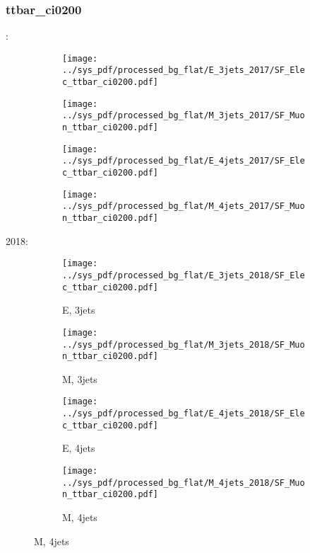 \documentclass{beamer}
\begin{document}
\begin{frame}
\frametitle{ttbar_ci0200}
\fontsize{5}{1}:
\begin{figure}
\centering
\begin{subfigure}[b]{0.24\textwidth}
\texttt{[image: ../sys\_pdf/processed\_bg\_flat/E\_3jets\_2017/SF\_Elec\_ttbar\_ci0200.pdf]}
\end{subfigure}
\begin{subfigure}[b]{0.24\textwidth}
\texttt{[image: ../sys\_pdf/processed\_bg\_flat/M\_3jets\_2017/SF\_Muon\_ttbar\_ci0200.pdf]}
\end{subfigure}
\begin{subfigure}[b]{0.24\textwidth}
\texttt{[image: ../sys\_pdf/processed\_bg\_flat/E\_4jets\_2017/SF\_Elec\_ttbar\_ci0200.pdf]}
\end{subfigure}
\begin{subfigure}[b]{0.24\textwidth}
\texttt{[image: ../sys\_pdf/processed\_bg\_flat/M\_4jets\_2017/SF\_Muon\_ttbar\_ci0200.pdf]}
\end{subfigure}
\end{figure}
2018:
\begin{figure}
\centering
\begin{subfigure}[b]{0.24\textwidth}
\texttt{[image: ../sys\_pdf/processed\_bg\_flat/E\_3jets\_2018/SF\_Elec\_ttbar\_ci0200.pdf]}
\captionsetup{font=tiny}
\caption{E, 3jets}
\end{subfigure}
\begin{subfigure}[b]{0.24\textwidth}
\texttt{[image: ../sys\_pdf/processed\_bg\_flat/M\_3jets\_2018/SF\_Muon\_ttbar\_ci0200.pdf]}
\captionsetup{font=tiny}
\caption{M, 3jets}
\end{subfigure}
\begin{subfigure}[b]{0.24\textwidth}
\texttt{[image: ../sys\_pdf/processed\_bg\_flat/E\_4jets\_2018/SF\_Elec\_ttbar\_ci0200.pdf]}
\captionsetup{font=tiny}
\caption{E, 4jets}
\end{subfigure}
\begin{subfigure}[b]{0.24\textwidth}
\texttt{[image: ../sys\_pdf/processed\_bg\_flat/M\_4jets\_2018/SF\_Muon\_ttbar\_ci0200.pdf]}
\captionsetup{font=tiny}
\caption{M, 4jets}
\end{subfigure}
\end{figure}
\end{frame}
\end{document}
